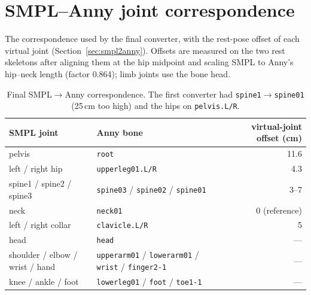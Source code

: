 \chapter{SMPL--Anny joint correspondence}
\label{app:mapping}

The correspondence used by the final converter, with the rest-pose offset of
each virtual joint (Section~\ref{sec:smpl2anny}). Offsets are measured on the
two rest skeletons after aligning them at the hip midpoint and scaling SMPL to
Anny's hip--neck length (factor 0.864); limb joints use the bone head.

\begin{table}[h]
\centering\small
\begin{tabular}{llr}
\toprule
SMPL joint & Anny bone & virtual-joint offset (cm) \\
\midrule
pelvis & \texttt{root} & 11.6 \\
left / right hip & \texttt{upperleg01.L/R} & 4.3 \\
spine1 / spine2 / spine3 & \texttt{spine03} / \texttt{spine02} / \texttt{spine01} & 3--7 \\
neck & \texttt{neck01} & 0 (reference) \\
left / right collar & \texttt{clavicle.L/R} & 5 \\
head & \texttt{head} & --- \\
shoulder / elbow / wrist / hand & \texttt{upperarm01} / \texttt{lowerarm01} / \texttt{wrist} / \texttt{finger2-1} & --- \\
knee / ankle / foot & \texttt{lowerleg01} / \texttt{foot} / \texttt{toe1-1} & --- \\
\bottomrule
\end{tabular}
\caption{Final SMPL$\rightarrow$Anny correspondence. The first converter had
\texttt{spine1}$\rightarrow$\texttt{spine01} (25\,cm too high) and the hips on
\texttt{pelvis.L/R}.}
\label{tab:mapping}
\end{table}
